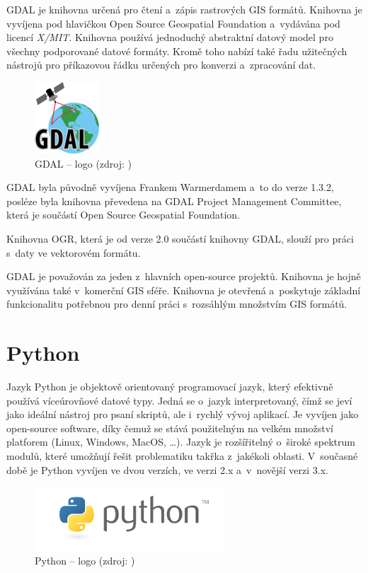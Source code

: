 \documentclass[a4paper,12pt,oneside]{book}
\begin{document}
GDAL je knihovna určená pro čtení a~zápis rastrových GIS formátů. Knihovna je vyvíjena pod hlavičkou Open Source Geospatial Foundation a~vydávána pod licencí \textit{X/MIT}. Knihovna používá jednoduchý abstraktní datový model pro všechny podporované datové formáty. Kromě toho nabízí také řadu užitečných nástrojů pro příkazovou řádku určených pro konverzi a~zpracování dat. \cite{gdal_wiki}

\begin{figure}[h]
\centering
\includegraphics[scale=1]{images/gdal-logo.png}
\caption[GDAL -- logo]{GDAL -- logo (zdroj: \cite{gdal})}
\end{figure}

GDAL byla původně vyvíjena Frankem Warmerdamem a~to do verze 1.3.2, posléze byla knihovna převedena na GDAL Project Management Committee, která je součástí Open Source Geospatial Foundation.\cite{gdal_wiki}

Knihovna OGR, která je od verze 2.0 součástí knihovny GDAL, slouží pro práci s~daty ve vektorovém formátu.\cite{gdal}

GDAL je považován za jeden z~hlavních open-source projektů. Knihovna je hojně využívána také v~komerční GIS sféře. Knihovna je otevřená a~poskytuje základní funkcionalitu potřebnou pro denní práci s~rozsáhlým množstvím GIS formátů.\cite{gdal_wiki}


\section{Python}

Jazyk Python je objektově orientovaný programovací jazyk, který efektivně používá víceúrovňové datové typy. Jedná se o~jazyk interpretovaný, čímž se jeví jako ideální nástroj pro psaní skriptů, ale i~rychlý vývoj aplikací. Je vyvíjen jako open-source software, díky čemuž se stává použitelným na velkém množství platforem (Linux, Windows, MacOS, \dots). Jazyk je rozšířitelný o~široké spektrum modulů, které umožňují řešit problematiku takřka z~jakékoli oblasti. V~současné době je Python vyvíjen ve dvou verzích, ve verzi 2.x a~v~novější verzi 3.x.
\cite{dive_into_python}
\cite{python_web}

\begin{figure}[htb]
\centering
\includegraphics[scale=1]{images/python-logo.png}
\caption[Python -- logo]{Python -- logo (zdroj: \cite{python_web})}
\end{figure}
\end{document}
